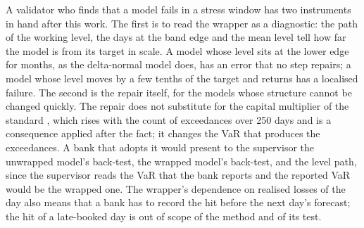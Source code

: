 A validator who finds that a model fails in a stress window has two instruments in hand after this work. The first is to read the wrapper as a diagnostic: the path of the working level, the days at the band edge and the mean level tell how far the model is from its target in scale. A model whose level sits at the lower edge for months, as the delta-normal model does, has an error that no step repairs; a model whose level moves by a few tenths of the target and returns has a localised failure. The second is the repair itself, for the models whose structure cannot be changed quickly. The repair does not substitute for the capital multiplier of the standard \citep{bcbs1996}, which rises with the count of exceedances over 250 days and is a consequence applied after the fact; it changes the VaR that produces the exceedances. A bank that adopts it would present to the supervisor the unwrapped model's back-test, the wrapped model's back-test, and the level path, since the supervisor reads the VaR that the bank reports and the reported VaR would be the wrapped one. The wrapper's dependence on realised losses of the day also means that a bank has to record the hit before the next day's forecast; the hit of a late-booked day is out of scope of the method and of its test.
